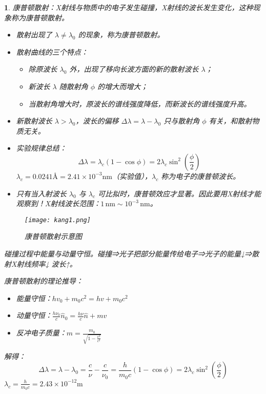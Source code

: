\documentclass[UTF8]{report}
\theoremstyle{MyLineTheoremStyle} %
\theoremstyle{MyBlockTheoremStyle} %
\theoremstyle{MySubsubsectionStyle} %
\newtheorem{definition}{}
\begin{document}
\begin{definition}
康普顿散射：X射线与物质中的电子发生碰撞，X射线的波长发生变化，这种现象称为康普顿散射。

\begin{itemize}
    \item 散射出现了 \(\lambda \neq \lambda_0\) 的现象，称为康普顿散射。
    \item 散射曲线的三个特点：
    \begin{itemize}
        \item 除原波长 \(\lambda_0\) 外，出现了移向长波方面的新的散射波长 \(\lambda\)；
        \item 新波长 \(\lambda\) 随散射角 \(\phi\) 的增大而增大；
        \item 当散射角增大时，原波长的谱线强度降低，而新波长的谱线强度升高。
    \end{itemize}
    \item 新散射波长 \(\lambda > \lambda_0\)，波长的偏移 \(\Delta \lambda = \lambda - \lambda_0\) 只与散射角 \(\phi\) 有关，和散射物质无关。
    \item 实验规律总结：
    \[
    \Delta \lambda = \lambda_c (1 - \cos \phi) = 2 \lambda_c \sin^2 \left( \frac{\phi}{2} \right)
    \]
    \(\lambda_c = 0.0241 \text{Å} = 2.41 \times 10^{-3} \text{nm}\)（实验值），\(\lambda_c\) 称为电子的康普顿波长。
    \item 只有当入射波长 \(\lambda_0\) 与 \(\lambda_c\) 可比拟时，康普顿效应才显著。因此要用X射线才能观察到！X射线波长范围：$1\,\text{nm} \sim 10^{-3}\,\text{nm}$。
\end{itemize}

\begin{figure}[H]
    \centering
    \texttt{[image: kang1.png]}
    \caption{康普顿散射示意图}
\end{figure}

碰撞过程中能量与动量守恒。碰撞⇒光子把部分能量传给电子⇒光子的能量↓⇒散射X射线频率↓ 波长↑。

康普顿散射的理论推导：
\begin{itemize}
    \item 能量守恒：\(hv_0 + m_0 c^2 = hv + m_0 c^2\)
    \item 动量守恒：\(\frac{h \nu_0}{c} \hat{n}_0 = \frac{h \nu}{c} \hat{n} + mv\)
    \item 反冲电子质量：\(m = \frac{m_0}{\sqrt{1 - \frac{v^2}{c^2}}}\)
\end{itemize}

解得：
\[
\Delta \lambda = \lambda - \lambda_0 = \frac{c}{\nu} - \frac{c}{\nu_0} = \frac{h}{m_0 c}(1 - \cos \phi) = 2 \lambda_c \sin^2 \left( \frac{\phi}{2} \right)
\]
\(\lambda_c = \frac{h}{m_0 c} = 2.43 \times 10^{-12} \text{m}\)


\end{definition}
\end{document}
